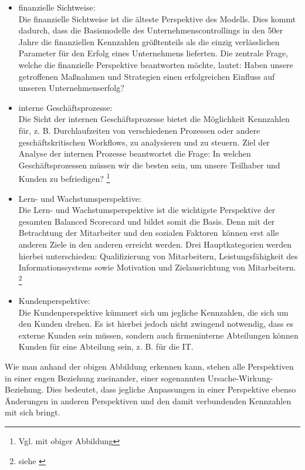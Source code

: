 \begin{itemize}
  \item finanzielle Sichtweise: \\
  Die finanzielle Sichtweise ist die älteste Perspektive des Modells. Dies kommt
  dadurch, dass die Basismodelle des Unternehmenscontrollings in den 50er Jahre
  die finanziellen Kennzahlen größtenteils als die einzig verlässlichen
  Parameter für den Erfolg eines Unternehmens lieferten. Die zentrale Frage, welche die
  finanzielle Perspektive beantworten möchte, lautet: \glqq Haben unsere getroffenen
  Maßnahmen und Strategien einen erfolgreichen Einfluss auf unseren
  Unternehmenserfolg?\glqq
  \item interne Geschäftsprozesse: \\
  Die Sicht der internen Geschäftsprozesse bietet die Möglichkeit Kennzahlen
  für, z. B. Durchlaufzeiten von verschiedenen Prozessen oder andere
  geschäftskritischen Workflows, zu analysieren und zu steuern. Ziel der Analyse
  der internen Prozesse beantwortet die Frage: \glqq In welchen Geschäftsprozessen
  müssen wir die besten sein, um unsere Teilhaber und Kunden zu befriedigen?\glqq
  \footnote{Vgl. mit obiger Abbildung}
  \item Lern- und Wachstumsperspektive: \\
  Die Lern- und Wachstumsperspektive ist die wichtigste Perspektive der gesamten
  Balanced Scorecard und bildet somit die Basis. Denn mit der Betrachtung der
  Mitarbeiter und den \glqq sozialen Faktoren\grqq~können erst alle anderen Ziele in 
  den anderen erreicht werden. \glqq Drei Hauptkategorien werden hierbei
  unterschieden: Qualifizierung von Mitarbeitern, Leistungsfähigkeit des 
  Informationssystems sowie Motivation und Zielausrichtung von Mitarbeitern.\glqq
  \footnote{siehe \cite{BalanceGabler}}
  \item Kundenperspektive: \\
  Die Kundenperspektive kümmert sich um jegliche Kennzahlen, die sich um den
  Kunden drehen. Es ist hierbei jedoch nicht zwingend notwendig, dass es externe
  Kunden sein müssen, sondern auch firmeninterne Abteilungen können Kunden für
  eine Abteilung sein, z. B. für die IT.
\end{itemize}
Wie man anhand der obigen Abbildung erkennen kann, stehen alle Perspektiven in
einer engen Beziehung zueinander, einer sogenannten
\glqq Ursache-Wirkung-Beziehung\glqq. Dies bedeutet, dass jegliche Anpassungen in einer
Perspektive ebenso Änderungen in anderen Perspektiven und den damit verbundenden
Kennzahlen mit sich bringt.
